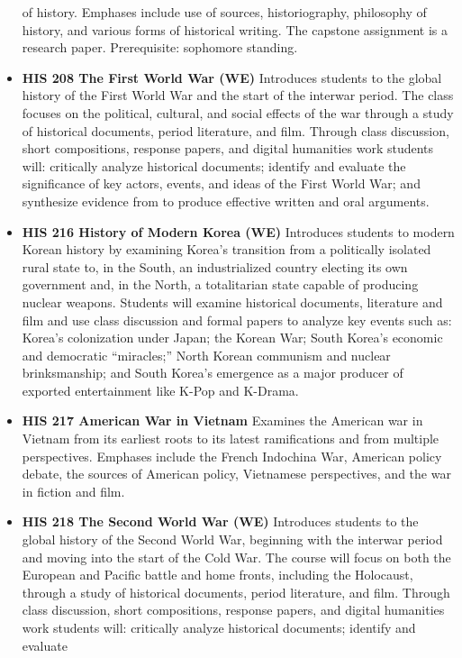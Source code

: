 \documentclass[
  letterpaper,
]{scrbook}
\begin{document}
\begin{itemize}
  of history. Emphases include use of sources, historiography,
  philosophy of history, and various forms of historical writing. The
  capstone assignment is a research paper. Prerequisite: sophomore
  standing.
\item
  \textbf{HIS 208 The First World War (WE)} Introduces students to the
  global history of the First World War and the start of the interwar
  period. The class focuses on the political, cultural, and social
  effects of the war through a study of historical documents, period
  literature, and film. Through class discussion, short compositions,
  response papers, and digital humanities work students will: critically
  analyze historical documents; identify and evaluate the significance
  of key actors, events, and ideas of the First World War; and
  synthesize evidence from to produce effective written and oral
  arguments.
\item
  \textbf{HIS 216 History of Modern Korea (WE)} Introduces students to
  modern Korean history by examining Korea's transition from a
  politically isolated rural state to, in the South, an industrialized
  country electing its own government and, in the North, a totalitarian
  state capable of producing nuclear weapons. Students will examine
  historical documents, literature and film and use class discussion and
  formal papers to analyze key events such as: Korea's colonization
  under Japan; the Korean War; South Korea's economic and democratic
  ``miracles;'' North Korean communism and nuclear brinksmanship; and
  South Korea's emergence as a major producer of exported entertainment
  like K-Pop and K-Drama.
\item
  \textbf{HIS 217 American War in Vietnam} Examines the American war in
  Vietnam from its earliest roots to its latest ramifications and from
  multiple perspectives. Emphases include the French Indochina War,
  American policy debate, the sources of American policy, Vietnamese
  perspectives, and the war in fiction and film.
\item
  \textbf{HIS 218 The Second World War (WE)} Introduces students to the
  global history of the Second World War, beginning with the interwar
  period and moving into the start of the Cold War. The course will
  focus on both the European and Pacific battle and home fronts,
  including the Holocaust, through a study of historical documents,
  period literature, and film. Through class discussion, short
  compositions, response papers, and digital humanities work students
  will: critically analyze historical documents; identify and evaluate

\end{itemize}
\end{document}
